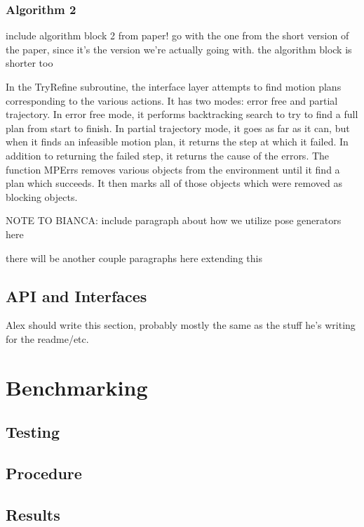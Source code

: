 \documentclass[12pt]{article}
\begin{document}
\subsubsection{Algorithm 2}

include algorithm block 2 from paper!  go with the one from the short version of the paper, since it's the version we're actually going with.  the algorithm block is shorter too

In the TryRefine subroutine, the interface layer attempts to find motion plans corresponding to the various actions.  
It has two modes: error free and partial trajectory.  
In error free mode, it performs backtracking search to try to find a full plan from start to finish.  
In partial trajectory mode, it goes as far as it can, but when it finds an infeasible motion plan, it returns the step at which it failed.  
In addition to returning the failed step, it returns the cause of the errors.  
The function MPErrs removes various objects from the environment until it find a plan which succeeds.  
It then marks all of those objects which were removed as blocking objects.

NOTE TO BIANCA: include paragraph about how we utilize pose generators here

there will be another couple paragraphs here extending this


\subsection{API and Interfaces}

Alex should write this section, probably mostly the same as the stuff he's writing for the readme/etc.

\section{Benchmarking}

\subsection{Testing}

\subsection{Procedure}

\subsection{Results}
\end{document}
